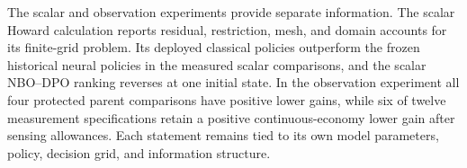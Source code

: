 The scalar and observation experiments provide separate information. The scalar Howard calculation reports residual, restriction, mesh, and domain accounts for its finite-grid problem. Its deployed classical policies outperform the frozen historical neural policies in the measured scalar comparisons, and the scalar NBO--DPO ranking reverses at one initial state. In the observation experiment all four protected parent comparisons have positive lower gains, while six of twelve measurement specifications retain a positive continuous-economy lower gain after sensing allowances. Each statement remains tied to its own model parameters, policy, decision grid, and information structure.
